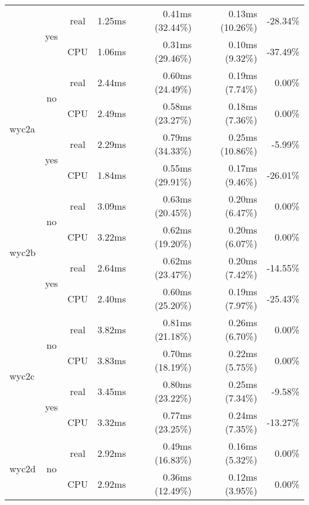 \documentclass[en]{pracamgr}
\begin{document}
\begin{appendices}
\begin{small}
\begin{longtable}{|l|c|c|r|r|r|r|}
                          \cline{2-7}
                          & \multirow{2}{*}{yes} & real & 1.25ms & 0.41ms (32.44\%) & 0.13ms (10.26\%) & -28.34\% \\*
                          &                      & CPU  & 1.06ms & 0.31ms (29.46\%) & 0.10ms (9.32\%) & -37.49\% \\
\hline
\multirow{4}{*}{wyc2a}    & \multirow{2}{*}{no}  & real & 2.44ms & 0.60ms (24.49\%) & 0.19ms (7.74\%) & 0.00\% \\*
                          &                      & CPU  & 2.49ms & 0.58ms (23.27\%) & 0.18ms (7.36\%) & 0.00\% \\*
                          \cline{2-7}
                          & \multirow{2}{*}{yes} & real & 2.29ms & 0.79ms (34.33\%) & 0.25ms (10.86\%) & -5.99\% \\*
                          &                      & CPU  & 1.84ms & 0.55ms (29.91\%) & 0.17ms (9.46\%) & -26.01\% \\
\hline
\multirow{4}{*}{wyc2b}    & \multirow{2}{*}{no}  & real & 3.09ms & 0.63ms (20.45\%) & 0.20ms (6.47\%) & 0.00\% \\*
                          &                      & CPU  & 3.22ms & 0.62ms (19.20\%) & 0.20ms (6.07\%) & 0.00\% \\*
                          \cline{2-7}
                          & \multirow{2}{*}{yes} & real & 2.64ms & 0.62ms (23.47\%) & 0.20ms (7.42\%) & -14.55\% \\*
                          &                      & CPU  & 2.40ms & 0.60ms (25.20\%) & 0.19ms (7.97\%) & -25.43\% \\
\hline
\multirow{4}{*}{wyc2c}    & \multirow{2}{*}{no}  & real & 3.82ms & 0.81ms (21.18\%) & 0.26ms (6.70\%) & 0.00\% \\*
                          &                      & CPU  & 3.83ms & 0.70ms (18.19\%) & 0.22ms (5.75\%) & 0.00\% \\*
                          \cline{2-7}
                          & \multirow{2}{*}{yes} & real & 3.45ms & 0.80ms (23.22\%) & 0.25ms (7.34\%) & -9.58\% \\*
                          &                      & CPU  & 3.32ms & 0.77ms (23.25\%) & 0.24ms (7.35\%) & -13.27\% \\
\hline
\multirow{4}{*}{wyc2d}    & \multirow{2}{*}{no}  & real & 2.92ms & 0.49ms (16.83\%) & 0.16ms (5.32\%) & 0.00\% \\*
                          &                      & CPU  & 2.92ms & 0.36ms (12.49\%) & 0.12ms (3.95\%) & 0.00\% \\*

\end{longtable}
\end{small}
\end{appendices}
\end{document}
